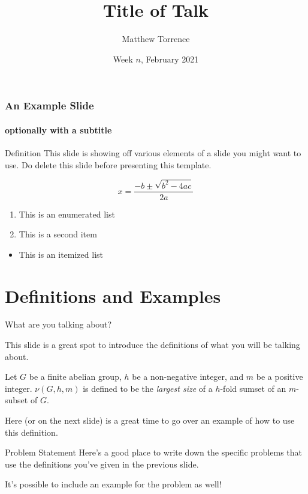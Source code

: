 \documentclass[aspectratio=169,usenames,dvipsnames]{beamer}
\title{Title of Talk}
\author[M. Torrence]{Matthew Torrence}
\date[2021]{Week $n$, February 2021}
\begin{document}
\titleslide

\begin{frame}[fragile]
\frametitle{An Example Slide}
\framesubtitle{optionally with a subtitle}

\begin{block}{Definition}
This slide is showing off various elements of a slide you might want to use. Do delete this slide before presenting this template.
\end{block}
$$x = \frac{-b \pm \sqrt{b^2 - 4ac}}{2a}$$
\begin{enumerate}
    \item This is an enumerated list
    \item This is a second item
\end{enumerate}
\begin{itemize}
    \item This is an itemized list
\end{itemize}

\end{frame}

\section{Definitions and Examples}

\begin{frame}[fragile]{What are you talking about?}

This slide is a great spot to introduce the definitions of what you will be talking about.

\s Let $G$ be a finite abelian group, $h$ be a non-negative integer, and $m$ be a positive integer. $\nu(G, h, m)$ is defined to be the \textit{largest size} of a $h$-fold sumset of an $m$-subset of $G$.

\s Here (or on the next slide) is a great time to go over an example of how to use this definition.

\end{frame}

\begin{frame}{Problem Statement}
Here's a good place to write down the specific problems that use the definitions you've given in the previous slide.

\s It's possible to include an example for the problem as well!
\end{frame}
\end{document}
